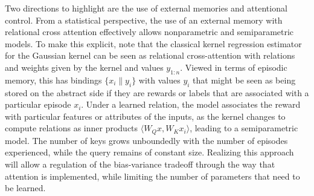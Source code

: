 Two directions to highlight are the use of external memories and attentional control. 
From a statistical perspective, the use of an external memory with relational cross attention effectively allows nonparametric and semiparametric models. To make this explicit, note that the classical kernel regression estimator for the Gaussian kernel
can be seen as relational cross-attention with relations and weights given by the kernel 
and values $y_{1:n}$. Viewed in terms of episodic memory, this has bindings $\{x_i\| y_i\}$ with values $y_i$ that 
might be seen as being stored on the abstract side if they are rewards or labels that are associated with 
a particular episode $x_i$. Under a learned relation, the model associates the reward with particular features or attributes of the inputs, as the kernel changes to compute relations as inner products $\langle W_Q x, W_K x_i \rangle$, leading to a semiparametric model. The number of keys grows unboundedly with the number of episodes experienced, while the query remains of constant size. Realizing this approach will allow a regulation of the bias-variance tradeoff through the way that attention is implemented, while limiting the number of parameters that need to be learned.

